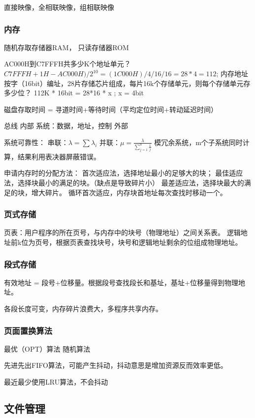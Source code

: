 \documentclass[UTF8]{../computerUniverse}
\begin{document}
直接映像，全相联映像，组相联映像

\subsubsection{内存}
随机存取存储器RAM，
只读存储器ROM

AC000H到C7FFFH共多少K个地址单元？
$C7FFFH + 1H - AC000H ) /2^{10} = (1C000H)/4/16/16 = 28*4 = 112$;
内存地址按字（16bit）编址，28片存储芯片组成，每片16k个存储单元，则每个存储单元存多少位？
112K * 16bit =  28*16 * x ; x = 4bit

磁盘存取时间 = 寻道时间+等待时间（平均定位时间+转动延迟时间）

总线
内部
系统：数据，地址，控制
外部

系统可靠性：
串联：$\lambda  = \sum \lambda_i$
并联：$\mu = \frac{\lambda}{\sum_{j=1}^n{\frac{1}{j}}}$
模冗余系统，m个子系统同时计算，结果利用表决器屏蔽错误。


申请内存时的分配方法：
首次适应法，选择地址最小的足够大的块；
最佳适应法，选择块最小的满足的块。（缺点是导致碎片小）
最差适应法，选择块最大的满足的块，增大碎片。
循环首次适应，内存块首地址每次查找时移动一个。


\subsubsection{页式存储}

页表：用户程序的所在页号，与内存中的块号（物理地址）之间关系表。
逻辑地址前k位为页号，根据页表查找块号，块号和逻辑地址剩余的位组成物理地址。


\subsubsection{段式存储}
有效地址 = 段号+位移量。根据段号查找段长和基址，基址+位移量得到物理地址。

各段长度可变，内存碎片浪费大，多程序共享内存。

\subsubsection{页面置换算法}
最优（OPT）算法
随机算法

先进先出FIFO算法，可能产生抖动，抖动意思是增加资源反而效率更低。

最近最少使用LRU算法，不会抖动



\subsection{文件管理}
\end{document}
